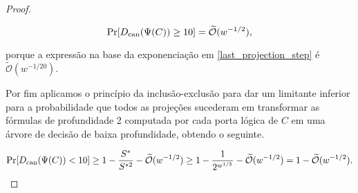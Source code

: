 \begin{proof}
\begin{itemize}
    \begin{equation*}
        \Pr[D_{\text{can}}(\Psi(C)) \geq 10] = \widetilde{\mathcal{O}}(w^{-1/2}),
    \end{equation*}
    
    porque a expressão na base da exponenciação em \ref{last_projection_step} é $\widetilde{\mathcal{O}}(w^{-1/20})$.
    
\end{itemize}

Por fim aplicamos o princípio da inclusão-exclusão para dar um limitante inferior para a probabilidade que todos as projeções sucederam em transformar as fórmulas de profundidade 2 computada por cada porta lógica de $C$ em uma árvore de decisão de baixa profundidade, obtendo o seguinte.

\begin{equation*}
    \Pr[D_{\text{can}}(\Psi(C)) < 10] \geq 1 - \frac{S^{*}}{S^{* 2}} - \widetilde{\mathcal{O}}(w^{-1/2}) \geq 1 - \frac{1}{2^{w^{1/5}}} - \widetilde{\mathcal{O}}(w^{-1/2}) = 1 - \widetilde{\mathcal{O}}(w^{-1/2}).
\end{equation*}




\end{proof}
